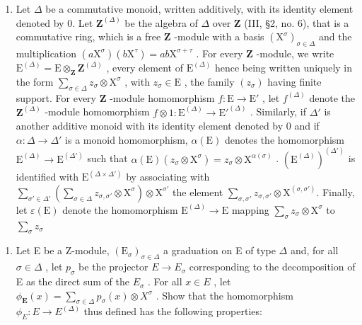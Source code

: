 \BourbakiExercisesSection

\begin{enumerate}
\def\labelenumi{\arabic{enumi}.}
\tightlist
\item
  Let \(\Delta\) be a commutative monoid, written additively, with its identity element denoted by 0. Let \(\mathbf{Z}^{(\Delta)}\) be the algebra of \(\Delta\) over \(\mathbf{Z}\) (III, §2, no. 6), that is a commutative ring, which is a free \(\mathbf{Z}\) -module with a basis \((\mathrm{X}^{\sigma})_{\sigma \in \Delta}\) and the multiplication \((a\mathrm{X}^{\sigma})(b\mathrm{X}^{\tau}) = ab\mathrm{X}^{\sigma +\tau}\) . For every \(\mathbf{Z}\) -module, we write \(\mathrm{E}^{(\Delta)} = \mathrm{E} \otimes_{\mathbf{Z}} \mathbf{Z}^{(\Delta)}\) , every element of \(\mathrm{E}^{(\Delta)}\) hence being written uniquely in the form \(\sum_{\sigma \in \Delta} z_{\sigma} \otimes \mathrm{X}^{\sigma}\) , with \(z_{\sigma} \in \mathrm{E}\) , the family \((z_{\sigma})\) having finite support. For every \(\mathbf{Z}\) -module homomorphism \(f: \mathrm{E} \to \mathrm{E}'\) , let \(f^{(\Delta)}\) denote the \(\mathbf{Z}^{(\Delta)}\) -module homomorphism \(f \otimes 1: \mathrm{E}^{(\Delta)} \to \mathrm{E}'^{(\Delta)}\) . Similarly, if \(\Delta'\) is another additive monoid with its identity element denoted by 0 and if \(\alpha: \Delta \to \Delta'\) is a monoid homomorphism, \(\alpha(\mathrm{E})\) denotes the homomorphism \(\mathrm{E}^{(\Delta)} \to \mathrm{E}^{(\Delta')}\) such that \(\alpha(\mathrm{E})(z_{\sigma} \otimes \mathrm{X}^{\sigma}) = z_{\sigma} \otimes \mathrm{X}^{\alpha(\sigma)}\) . \((\mathrm{E}^{(\Delta)})^{(\Delta')}\) is identified with \(\mathrm{E}^{(\Delta \times \Delta')}\) by associating with \(\sum_{\sigma' \in \Delta'} \left( \sum_{\sigma \in \Delta} z_{\sigma, \sigma'} \otimes \mathrm{X}^{\sigma} \right) \otimes \mathrm{X}^{\sigma'}\) the element \(\sum_{\sigma, \sigma'} z_{\sigma, \sigma'} \otimes \mathrm{X}^{(\sigma, \sigma')}.\) Finally, let \(\varepsilon(\mathrm{E})\) denote the homomorphism \(\mathrm{E}^{(\Delta)} \to \mathrm{E}\) mapping \(\sum_{\sigma} z_{\sigma} \otimes \mathrm{X}^{\sigma}\) to \(\sum_{\sigma} z_{\sigma}\)
\end{enumerate}

\begin{enumerate}
\def\labelenumi{(\alph{enumi})}
\tightlist
\item
  Let E be a Z-module, \((\mathrm{E}_{\sigma})_{\sigma\in\Delta}\) a graduation on E of type \(\Delta\) and, for all \(\sigma\in\Delta\) , let \(p_{\sigma}\) be the projector \(E\to E_{\sigma}\) corresponding to the decomposition of E as the direct sum of the \(E_{\sigma}\) . For all \(x\in E\) , let \(\phi_{\mathbf{E}}(x)=\sum_{\sigma\in\Delta}p_{\sigma}(x)\otimes X^{\sigma}\) . Show that the homomorphism \(\phi_{E}\colon E\to E^{(\Delta)}\) thus defined has the following properties:
\end{enumerate}

